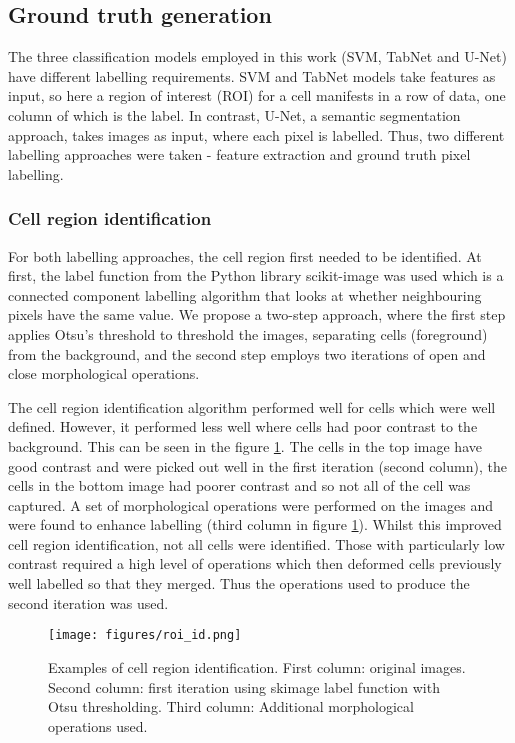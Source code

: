 \documentclass[final,5p,times,twocolumn,authoryear]{elsarticle}
\begin{document}
\subsection{Ground truth generation}
\label{ssec:ex_data}
The three classification models employed in this work (SVM, TabNet and U-Net) have different labelling requirements. SVM and TabNet models take features as input, so here a region of interest (ROI) for a cell manifests in a row of data, one column of which is the label. In contrast, U-Net, a semantic segmentation approach, takes images as input, where each pixel is labelled. Thus, two different labelling approaches were taken - feature extraction and ground truth pixel labelling.

\subsubsection{Cell region identification}
\label{ssubsec:subsec01}
For both labelling approaches, the cell region first needed to be identified. At first, the label function from the Python library scikit-image \citep{VanDerWalt2014Scikit-image:Python} was used which is a connected component labelling algorithm that looks at whether neighbouring pixels have the same value. We propose a two-step approach, where the first step applies Otsu's threshold to threshold the images, separating cells (foreground) from the background, and the second step employs two iterations of open and close morphological operations.

The cell region identification algorithm performed well for cells which were well defined. However, it performed less well where cells had poor contrast to the background. This can be seen in the figure \ref{fig:roi_id}. The cells in the top image have good contrast and were picked out well in the first iteration (second column), the cells in the bottom image had poorer contrast and so not all of the cell was captured. A set of morphological operations were performed on the images and were found to enhance labelling (third column in figure \ref{fig:roi_id}). Whilst this improved cell region identification, not all cells were identified. Those with particularly low contrast required a high level of operations which then deformed cells previously well labelled so that they merged. Thus the operations used to produce the second iteration was used.

\begin{figure}[t!]
	\centering
	\texttt{[image: figures/roi\_id.png]}
	\caption[Examples of cell region identification]{Examples of cell region identification. First column: original images. Second column: first iteration using skimage label function with Otsu thresholding. Third column: Additional morphological operations used.}
	\label{fig:roi_id}
\end{figure}
\end{document}
